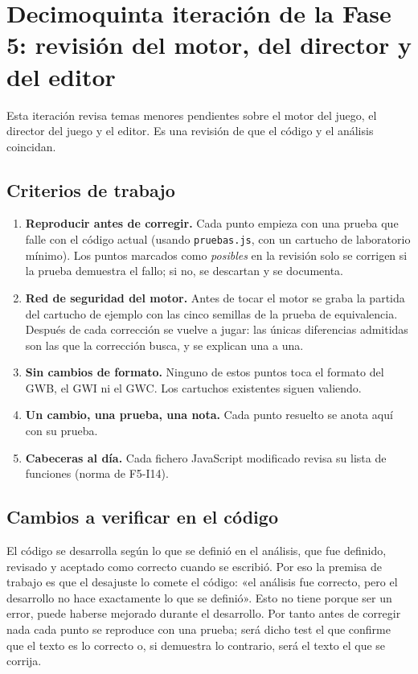 \section{Decimoquinta iteración de la Fase 5: revisión del motor, del director y del editor}
\label{sec:F5I15}

Esta iteración revisa temas menores pendientes sobre el motor del juego, el director del juego y el editor. Es una revisión de que el código y el análisis coincidan.

\subsection{Criterios de trabajo}
\label{sec:F5I15Criterios}

\begin{enumerate}
	\item \textbf{Reproducir antes de corregir.} Cada punto empieza con una prueba que falle con el código actual (usando  \texttt{pruebas.js}, con un cartucho de laboratorio mínimo). Los puntos marcados como \emph{posibles} en la revisión solo se corrigen si la prueba demuestra el fallo; si no, se descartan y se documenta.
	
	\item \textbf{Red de seguridad del motor.} Antes de tocar el motor se graba la partida del cartucho de ejemplo con las cinco semillas de la prueba de equivalencia. Después de cada corrección se vuelve a jugar: las únicas diferencias admitidas son las que la corrección busca, y se explican una a una.
	
	\item \textbf{Sin cambios de formato.} Ninguno de estos puntos toca el formato del GWB, el GWI ni el GWC. Los cartuchos existentes siguen valiendo.
	
	\item \textbf{Un cambio, una prueba, una nota.} Cada punto resuelto se anota aquí con su prueba.
	
	\item \textbf{Cabeceras al día.} Cada fichero JavaScript modificado revisa su lista de funciones (norma de F5-I14).
\end{enumerate}

\subsection{Cambios a verificar en el código}
\label{sec:F5I15Codigo}

El código se desarrolla según lo que se definió en el análisis, que fue definido, revisado y aceptado como correcto cuando se escribió. Por eso la premisa de trabajo es que el desajuste lo comete el código: «el análisis fue correcto, pero el desarrollo no hace exactamente lo que se definió». Esto no tiene porque ser un error, puede haberse mejorado durante el desarrollo. Por tanto antes de corregir nada cada punto se reproduce con una prueba; será dicho test el que confirme que el texto es lo correcto o, si demuestra lo contrario, será el texto el que se corrija.

